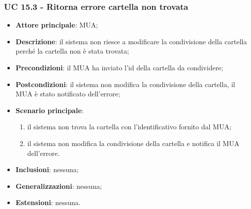 \subsubsection{UC 15.3 - Ritorna errore cartella non trovata} \label{sec:UC15.3}
    \begin{itemize}
        \item \textbf{Attore principale}: MUA;
        \item \textbf{Descrizione}: il sistema non riesce a modificare la condivisione della cartella perché la cartella non è stata trovata;
        \item \textbf{Precondizioni}: il MUA ha inviato l'id della cartella da condividere;
        \item \textbf{Postcondizioni}: il sistema non modifica la condivisione della cartella, il MUA è stato notificato dell'errore;
        \item \textbf{Scenario principale}:
            \begin{enumerate}
                \item il sistema non trova la cartella con l'identificativo fornito dal MUA;
                \item il sistema non modifica la condivisione della cartella e notifica il MUA dell'errore.
            \end{enumerate}
        \item \textbf{Inclusioni}: nessuna;
        \item \textbf{Generalizzazioni}: nessuna;
        \item \textbf{Estensioni}: nessuna.
    \end{itemize}

